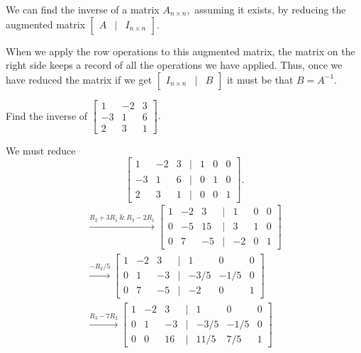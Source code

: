 We can find the inverse of a matrix \(A_{n\times n},\) assuming it exists, by reducing the augmented matrix \(\begin{bmatrix}
    A & \vert & I_{n\times n}
\end{bmatrix}.\)

When we apply the row operations to this augmented matrix, the matrix on the right side keeps a record of all the operations we have applied. Thus, once we have reduced the matrix if we get \(\begin{bmatrix}
    I_{n\times n} & \vert & B
\end{bmatrix}\) it must be that \(B = A^{-1}.\)

\begin{example}
    Find the inverse of \(\begin{bmatrix}
        1 & -2 & 3 \\
        -3 & 1 & 6 \\
        2 & 3 & 1
    \end{bmatrix}.\)
    \begin{solution}
        We must reduce \[\begin{bmatrix}
        1 & -2 & 3 & \vert & 1 & 0 & 0\\
        -3 & 1 & 6 & \vert & 0 & 1 & 0\\
        2 & 3 & 1 & \vert & 0 & 0 & 1
    \end{bmatrix}.\]
    \begin{gather*}
        \overset{R_2+3R_1 \ \& \ R_3-2R_1}{\longrightarrow} \begin{bmatrix}
        1 & -2 & 3 & \vert & 1 & 0 & 0\\
        0 & -5 & 15 & \vert & 3 & 1 & 0\\
        0 & 7 & -5 & \vert & -2 & 0 & 1
    \end{bmatrix}\\
    \overset{-R_2/5}{\longrightarrow} \begin{bmatrix}
        1 & -2 & 3 & \vert & 1 & 0 & 0\\
        0 & 1 & -3 & \vert & -3/5 & -1/5 & 0\\
        0 & 7 & -5 & \vert & -2 & 0 & 1
    \end{bmatrix}\\
    \overset{R_3-7R_2}{\longrightarrow} \begin{bmatrix}
        1 & -2 & 3 & \vert & 1 & 0 & 0\\
        0 & 1 & -3 & \vert & -3/5 & -1/5 & 0\\
        0 & 0 & 16 & \vert & 11/5 & 7/5 & 1

\end{bmatrix}
\end{gather*}
\end{solution}
\end{example}
